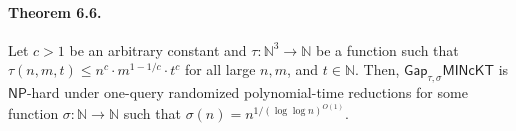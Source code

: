 \paragraph{Theorem 6.6.}
Let $c>1$ be an arbitrary constant and $\tau:\mathbb N^3\to\mathbb N$ be a function such that $\tau(n,m,t)\leq n^c\cdot m^{1-1/c}\cdot t^c$ for all large $n,m$, and $t\in\mathbb N$. Then, $\mathsf{Gap}_{\tau,\sigma}\mathsf{MINcKT}$ is $\mathsf{NP}$-hard under one-query randomized polynomial-time reductions for some function $\sigma:\mathbb N\to\mathbb N$ such that $\sigma(n)=n^{1/(\log\log n)^{O(1)}}$.
